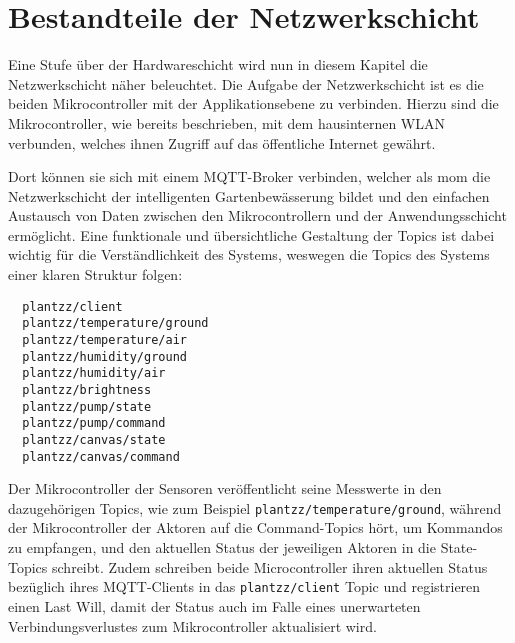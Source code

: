 
\section{Bestandteile der Netzwerkschicht}

Eine Stufe über der Hardwareschicht wird nun in diesem Kapitel die Netzwerkschicht näher beleuchtet.
Die Aufgabe der Netzwerkschicht ist es die beiden Mikrocontroller mit der Applikationsebene zu verbinden.
Hierzu sind die Mikrocontroller, wie bereits beschrieben, mit dem hausinternen WLAN verbunden, welches ihnen Zugriff auf das öffentliche Internet gewährt.

Dort können sie sich mit einem MQTT-Broker verbinden, welcher als \gls{mom} die Netzwerkschicht der intelligenten Gartenbewässerung bildet und den einfachen Austausch von Daten zwischen den Mikrocontrollern und der Anwendungsschicht ermöglicht.
Eine funktionale und übersichtliche Gestaltung der Topics ist dabei wichtig für die Verständlichkeit des Systems, weswegen die Topics des Systems einer klaren Struktur folgen:

\begin{verbatim}
  plantzz/client
  plantzz/temperature/ground
  plantzz/temperature/air
  plantzz/humidity/ground
  plantzz/humidity/air
  plantzz/brightness
  plantzz/pump/state
  plantzz/pump/command
  plantzz/canvas/state
  plantzz/canvas/command
\end{verbatim}

Der Mikrocontroller der Sensoren veröffentlicht seine Messwerte in den dazugehörigen Topics, wie zum Beispiel \texttt{plantzz/temperature/ground}, während der Mikrocontroller der Aktoren auf die Command-Topics hört, um Kommandos zu empfangen, und den aktuellen Status der jeweiligen Aktoren in die State-Topics schreibt.
Zudem schreiben beide Microcontroller ihren aktuellen Status bezüglich ihres MQTT-Clients in das \texttt{plantzz/client} Topic und registrieren einen Last Will, damit der Status auch im Falle eines unerwarteten Verbindungsverlustes zum Mikrocontroller aktualisiert wird.